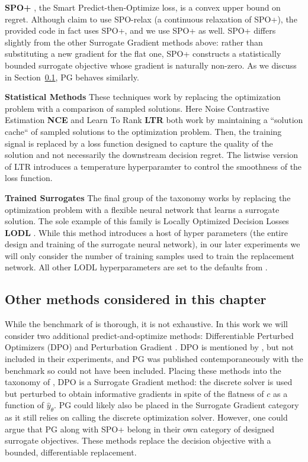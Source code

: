 \textbf{SPO+} \citep{elmachtoubSmartPredictThen2022}, the Smart Predict-then-Optimize loss, is a convex upper bound on regret. Although \citet{gengBenchmarkingPtOPnO2024} claim to use SPO-relax (a continuous relaxation of SPO+), the provided code in fact uses SPO+, and we use SPO+ as well. SPO+ differs slightly from the other Surrogate Gradient methods above: rather than substituting a new gradient for the flat one, SPO+ constructs a statistically bounded surrogate objective whose gradient is naturally non-zero. As we discuss in Section~\ref{sec:methods_added}, PG behaves similarly.

\textbf{Statistical Methods}
These techniques work by replacing the optimization problem with a comparison of sampled solutions. Here Noise Contrastive Estimation \textbf{NCE} \citep{mulambaContrastiveLossesSolution2021} and Learn To Rank \textbf{LTR} \citep{mandiDecisionFocusedLearningLens2022} both work by maintaining a ``solution cache`` of sampled solutions to the optimization problem. Then, the training signal is replaced by a loss function designed to capture the quality of the solution and not necessarily the downstream decision regret.  The listwise version of LTR introduces a temperature hyperparamter to control the smoothness of the loss function.

\textbf{Trained Surrogates} The final group of the taxonomy works by replacing the optimization problem with a flexible neural network that learns a surrogate solution. The sole example of this family is Locally Optimized Decision Losses \textbf{LODL} \citep{shahDecisionFocusedLearningDifferentiable2022}. While this method introduces a host of hyper parameters (the entire design and training of the surrogate neural network), in our later experiments we will only consider the number of training samples used to train the replacement network. All other LODL hyperparameters are set to the defaults from \citet{gengBenchmarkingPtOPnO2024}.

\subsection{Other methods considered in this chapter}
\label{sec:methods_added}
While the benchmark of \citet{gengBenchmarkingPtOPnO2024} is thorough, it is not exhaustive. In this work we will consider two additional predict-and-optimize methods: Differentiable Perturbed Optimizers (DPO) \citep{berthetLearningDifferentiablePerturbed2020} and Perturbation Gradient \citep{huang2024decisionfocusedPG}. DPO is mentioned by \citet{gengBenchmarkingPtOPnO2024}, but not included in their experiments, and PG was published contemporaneously with the benchmark so could not have been included. Placing these methods into the taxonomy of \citet{gengBenchmarkingPtOPnO2024}, DPO is a Surrogate Gradient method: the discrete solver is used but perturbed to obtain informative gradients in spite of the flatness of $c$ as a function of $\hat y_\theta$. PG could likely also be placed in the Surrogate Gradient category as it still relies on calling the discrete optimization solver. However, one could argue that PG along with SPO+ belong in their own category of designed surrogate objectives. These methods replace the decision objective with a bounded, differentiable replacement.

